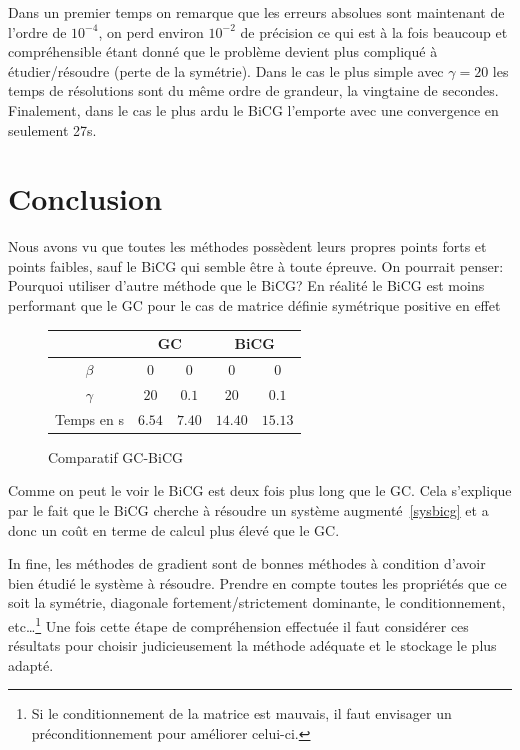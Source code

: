 \documentclass[twoside,12pt]{report}
\theoremstyle{remark}
\begin{document}
Dans un premier temps on remarque que les erreurs absolues sont maintenant de l'ordre de $10^{-4}$, on perd environ $10^{-2}$ de précision ce qui est à la fois beaucoup et compréhensible étant donné que le problème devient plus compliqué à étudier/résoudre (perte de la symétrie). Dans le cas le plus simple avec $\gamma=20$ les temps de résolutions sont du même ordre de grandeur, la vingtaine de secondes. Finalement, dans le cas le plus ardu le BiCG l'emporte avec une convergence en seulement 27s.

\chapter{Conclusion}

Nous avons vu que toutes les méthodes possèdent leurs propres points forts et points faibles, sauf le BiCG qui semble être à toute épreuve. On pourrait penser: Pourquoi utiliser d'autre méthode que le BiCG\@? En réalité le BiCG est moins performant que le GC pour le cas de matrice définie symétrique positive en effet

\begin{figure}[h]
\centering
\begin{tabular}{|c|c|c|c|c|}
\cline{2-5}
\multicolumn{1}{c|}{}& \multicolumn{2}{|c|}{GC} & \multicolumn{2}{|c|}{BiCG} \\ \hline
$\beta$ & $0$ & $0$ & $0$ & $0$ \\ \hline
$\gamma$ & $20$ & $0.1$ & $20$ & $0.1$ \\ \hline
Temps en s & $6.54$ & $7.40$ & $14.40$ & $15.13$ \\
\hline
\end{tabular}
\caption{Comparatif GC-BiCG}
\end{figure}

Comme on peut le voir le BiCG est deux fois plus long que le GC\@. Cela s'explique par le fait que le BiCG cherche à résoudre un système augmenté~\eqref{sysbicg} et a donc un coût en terme de calcul plus élevé que le GC\@.

In fine, les méthodes de gradient sont de bonnes méthodes à condition d'avoir bien étudié le système à résoudre. Prendre en compte toutes les propriétés que ce soit la symétrie, diagonale fortement/strictement dominante, le conditionnement, etc\ldots\footnote{Si le conditionnement de la matrice est mauvais, il faut envisager un préconditionnement pour améliorer celui-ci.} Une fois cette étape de compréhension effectuée il faut considérer ces résultats pour choisir judicieusement la méthode adéquate et le stockage le plus adapté.
\end{document}

